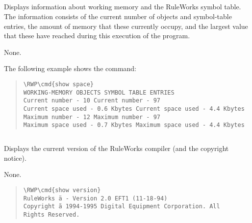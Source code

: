 {{\subsection{}

Displays information about working memory and the RuleWorks
symbol table. The information consists of the current number
of objects and symbol-table entries, the amount of memory
that these currently occupy, and the largest value that these
have reached during this execution of the program.

\Format


\Arguments

None.

\Example

The following example shows the  command:

\begin{quote}
\begin{Verbatim}[commandchars=\\\{\}]
\RWP\cmd{show space}
WORKING-MEMORY OBJECTS SYMBOL TABLE ENTRIES
Current number - 10 Current number - 97
Current space used - 0.6 Kbytes Current space used - 4.4 Kbytes
Maximum number - 12 Maximum number - 97
Maximum space used - 0.7 Kbytes Maximum space used - 4.4 Kbytes
\end{Verbatim}
\end{quote}

\subsection{}

Displays the current version of the RuleWorks compiler (and
the copyright notice).

\Format


\Arguments

None.

\Example

\begin{quote}
\begin{Verbatim}[commandchars=\\\{\}]
\RWP\cmd{show version}
RuleWorks ä - Version 2.0 EFT1 (11-18-94)
Copyright ã 1994-1995 Digital Equipment Corporation. All
Rights Reserved.
\end{Verbatim}
\end{quote}

\subsection{}

}}
